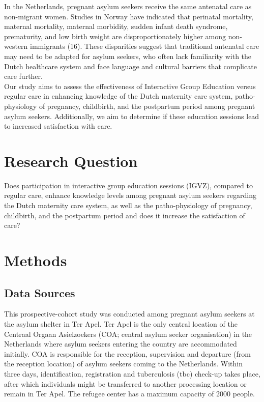 \documentclass[12pt]{article}
\begin{document}
\noindent In the Netherlands, pregnant asylum seekers receive the same antenatal care as non-migrant women. Studies in Norway have indicated that perinatal mortality, maternal mortality, maternal morbidity, sudden infant death syndrome, prematurity, and low birth weight are disproportionately higher among non-western immigrants (16). These disparities suggest that traditional antenatal care may need to be adapted for asylum seekers, who often lack familiarity with the Dutch healthcare system and face language and cultural barriers that complicate care further. \\

\noindent Our study aims to assess the effectiveness of Interactive Group Education versus regular care in enhancing knowledge of the Dutch maternity care system, patho-physiology of pregnancy, childbirth, and the postpartum period among pregnant asylum seekers. Additionally, we aim to determine if these education sessions lead to increased satisfaction with care.

\section{Research Question}
Does participation in interactive group education sessions (IGVZ), compared to regular care, enhance knowledge levels among pregnant asylum seekers regarding the Dutch maternity care system, as well as the patho-physiology of pregnancy, childbirth, and the postpartum period and does it increase the satisfaction of care? 

\section{Methods}
\subsection{Data Sources}
This prospective-cohort study was conducted among pregnant asylum seekers at the asylum shelter in Ter Apel. 
Ter Apel is the only central location of the Centraal Orgaan Asielzoekers (COA; central asylum seeker organisation) in the Netherlands where asylum seekers entering the country are accommodated initially. COA is responsible for the reception, supervision and departure (from the reception location) of asylum seekers coming to the Netherlands. Within three days, identification, registration and tuberculosis (tbc) check-up takes place, after which individuals might be transferred to another processing location or remain in Ter Apel. The refugee center has a maximum capacity of 2000 people. \\
\end{document}
